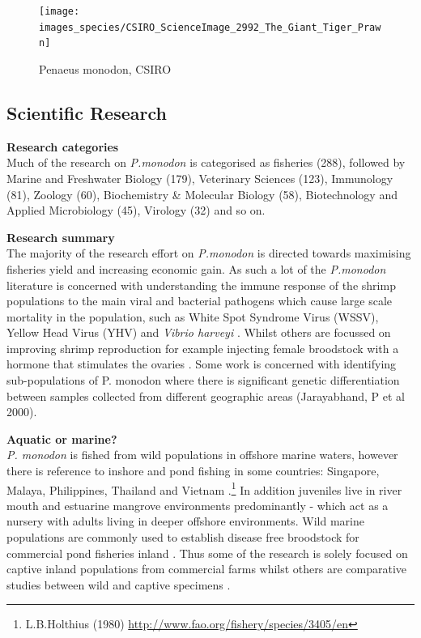 \documentclass[]{book}
\theoremstyle{definition}
\theoremstyle{definition}
\theoremstyle{definition}
\theoremstyle{remark}
\begin{document}
\begin{figure}

{\centering \texttt{[image: images\_species/CSIRO\_ScienceImage\_2992\_The\_Giant\_Tiger\_Prawn]} 

}

\caption{Penaeus monodon, CSIRO}\label{fig:unnamed-chunk-8}
\end{figure}

\hypertarget{scientific-research-6}{%
\subsection{Scientific Research}\label{scientific-research-6}}

\textbf{Research categories}\\
Much of the research on \emph{P.monodon} is categorised as fisheries
(288), followed by Marine and Freshwater Biology (179), Veterinary
Sciences (123), Immunology (81), Zoology (60), Biochemistry \& Molecular
Biology (58), Biotechnology and Applied Microbiology (45), Virology (32)
and so on.

\textbf{Research summary}\\
The majority of the research effort on \emph{P.monodon} is directed
towards maximising fisheries yield and increasing economic gain. As such
a lot of the \emph{P.monodon} literature is concerned with understanding
the immune response of the shrimp populations to the main viral and
bacterial pathogens which cause large scale mortality in the population,
such as White Spot Syndrome Virus (WSSV), Yellow Head Virus (YHV) and
\emph{Vibrio harveyi} \citep{Ponprateep_2011, Jaree_2012}. Whilst others
are focussed on improving shrimp reproduction for example injecting
female broodstock with a hormone that stimulates the ovaries
\citep{Sathapondecha_2015}. Some work is concerned with identifying
sub-populations of P. monodon where there is significant genetic
differentiation between samples collected from different geographic
areas (Jarayabhand, P et al 2000).

\textbf{Aquatic or marine?}\\
\emph{P. monodon} is fished from wild populations in offshore marine
waters, however there is reference to inshore and pond fishing in some
countries: Singapore, Malaya, Philippines, Thailand and Vietnam
\citep{Engle_2017}.\footnote{L.B.Holthius (1980)
  \url{http://www.fao.org/fishery/species/3405/en}} In addition
juveniles live in river mouth and estuarine mangrove environments
predominantly - which act as a nursery with adults living in deeper
offshore environments. Wild marine populations are commonly used to
establish disease free broodstock for commercial pond fisheries inland
\citep{Claydon_2010}. Thus some of the research is solely focused on
captive inland populations from commercial farms whilst others are
comparative studies between wild and captive specimens
\citep{Caipang_2010}.
\end{document}

